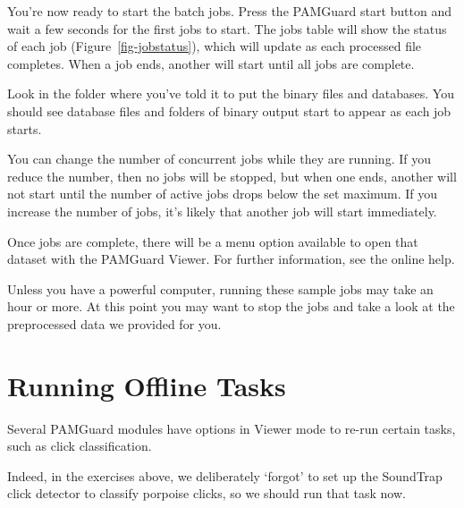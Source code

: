 \documentclass[
]{article}
\begin{document}
You're now ready to start the batch jobs. Press the PAMGuard start
button and wait a few seconds for the first jobs to start. The jobs
table will show the status of each job (Figure~\ref{fig-jobstatus}),
which will update as each processed file completes. When a job ends,
another will start until all jobs are complete.

Look in the folder where you've told it to put the binary files and
databases. You should see database files and folders of binary output
start to appear as each job starts.

You can change the number of concurrent jobs while they are running. If
you reduce the number, then no jobs will be stopped, but when one ends,
another will not start until the number of active jobs drops below the
set maximum. If you increase the number of jobs, it's likely that
another job will start immediately.

Once jobs are complete, there will be a menu option available to open
that dataset with the PAMGuard Viewer. For further information, see the
online help.

\begin{tcolorbox}[enhanced jigsaw, titlerule=0mm, colframe=quarto-callout-tip-color-frame, toptitle=1mm, opacitybacktitle=0.6, breakable, title=\textcolor{quarto-callout-tip-color}{\faLightbulb}\hspace{0.5em}{Impatient ?}, left=2mm, bottomrule=.15mm, colbacktitle=quarto-callout-tip-color!10!white, coltitle=black, colback=white, toprule=.15mm, bottomtitle=1mm, arc=.35mm, rightrule=.15mm, leftrule=.75mm, opacityback=0]

Unless you have a powerful computer, running these sample jobs may take
an hour or more. At this point you may want to stop the jobs and take a
look at the preprocessed data we provided for you.

\end{tcolorbox}

\section{Running Offline Tasks}\label{running-offline-tasks}

Several PAMGuard modules have options in Viewer mode to re-run certain
tasks, such as click classification.

Indeed, in the exercises above, we deliberately `forgot' to set up the
SoundTrap click detector to classify porpoise clicks, so we should run
that task now.
\end{document}

